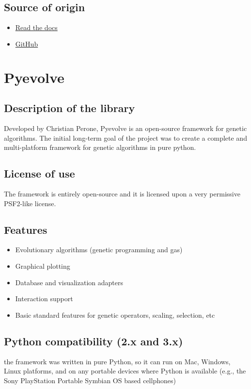 \documentclass{article}
\begin{document}
\subsection{Source of origin}
 \begin{itemize}
     \item \href{https://gaft.readthedocs.io/en/latest/api/index.html}{Read the docs}
     \item \href{https://github.com/PytLab/gaft}{GitHub}
 \end{itemize}
 
\section{Pyevolve}
\subsection{Description of the library}
Developed by Christian Perone, Pyevolve is an open-source framework for genetic algorithms. The initial long-term goal of the project was to create a complete and multi-platform framework for genetic algorithms in pure python.
\subsection{License of use}
 The framework is entirely open-source and it is licensed upon a very permissive PSF2-like license.
\subsection{Features}
\begin{itemize}
    \item Evolutionary algorithms (genetic programming  and gas)
    \item Graphical plotting
    \item Database and visualization adapters
    \item Interaction support
    \item Basic standard features for genetic operators, scaling, selection, etc
\end{itemize}
\subsection{Python compatibility (2.x and 3.x)}
 the framework was written in pure Python, so it can run on Mac, Windows, Linux platforms, and on any portable devices where Python is available (e.g., the Sony PlayStation Portable Symbian OS based cellphones)
\end{document}
